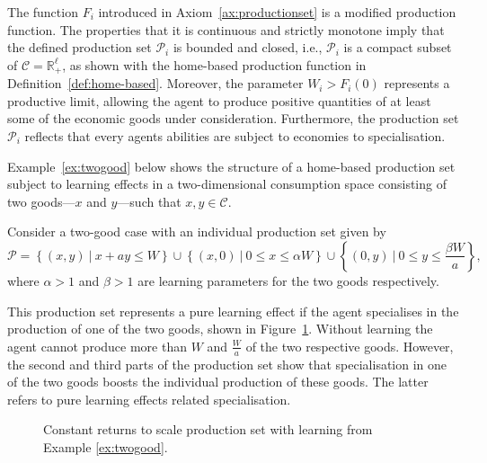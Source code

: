 The function $F_i$ introduced in Axiom~\ref{ax:productionset} is a modified production function. The properties that it is continuous and strictly monotone imply that the defined production set $\mathcal{P}_i$ is bounded and closed, i.e., $\mathcal{P}_i$ is a compact subset of $\mathcal{C} = \mathbb{R}_{+}^{\ell}$, as shown with the home-based production function in Definition~\ref{def:home-based}. Moreover, the parameter $W_{i} > F_{i}(0)$ represents a productive limit, allowing the agent to produce positive quantities of at least some of the economic goods under consideration. Furthermore, the production set $\mathcal{P}_i$ reflects that every agents abilities are subject to economies to specialisation.

Example~\ref{ex:twogood} below shows the structure of a home-based production set subject to learning effects in a two-dimensional consumption space consisting of two goods---$x$ and $y$---such that $x,y \in \mathcal{C}$.

\begin{example} \label{ex:twogood}
Consider a two-good case with an individual production set given by
\begin{equation}
\mathcal{P} = \left\{ (x,y) ~ | ~ x + ay \leqslant W \right\} \cup \left\{ (x,0) ~ | ~ 0 \leqslant x \leqslant \alpha W \right\} \cup \left\{ (0,y) ~ | ~ 0 \leqslant y \leqslant \frac{\beta W}{a} \right\} ,
\end{equation}
where $\alpha > 1$ and $\beta > 1$ are learning parameters for the two goods respectively.

This production set represents a pure learning effect if the agent specialises in the production of one of the two goods, shown in Figure~\ref{fig:production}. Without learning the agent cannot produce more than $W$ and $\frac{W}{a}$ of the two respective goods. However, the second and third parts of the production set show that specialisation in one of the two goods boosts the individual production of these goods. The latter refers to pure learning effects related specialisation.
\end{example}

\begin{figure}[t]
\begin{center}
\end{center}
\caption[Constant returns to scale production set with learning]{Constant returns to scale production set with learning from Example \ref{ex:twogood}.}
\label{fig:production}
\end{figure}

